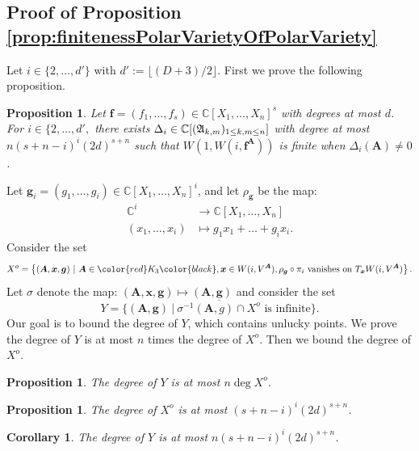 \documentclass[12pt]{article}
\def\mA{{\bm A}}
\def\C{\mathbb{C}}
\newtheorem{corollary}[theorem]{Corollary}
\newtheorem{prop}[theorem]{Proposition}
\def\mA{{\bm A}}
\def\C{\mathbb{C}}
\begin{document}
\subsection{Proof of Proposition \ref{prop:finitenessPolarVarietyOfPolarVariety}}
Let $i\in\{2,\hdots,d' \}$ with $d':=\lfloor (D+3)/2\rfloor.$ First we prove the following proposition.
%
\begin{prop}\label{prop:finitenessPolarVarietyOfPolarVarietyi}
Let $\bm{f} = (f_1,\hdots,f_s)  \in \C[X_1,\hdots,X_n]^s$ with degrees at most $d$. For $i\in\{2,\hdots,d',$ there exists $\Delta_i \in \C[(\frak{A}_{k,m})_{1 \le k,m \le n}]$ with degree at most $n(s+n-i)^i(2d)^{s+n}$ such that $W(1,W(i,\bm{f}^\mA))$ is finite when $\Delta_i(\mA) \neq 0$.
\end{prop}
%
\noindent 
Let $\bm g_i = (g_1,\hdots,g_i) \in \C[X_1,\hdots,X_n]^i$, and let $\rho_{\bm g}$ be the map: 
%
\begin{align*}
\mathbb{C}^i &\rightarrow \C[X_1,\hdots,X_n]\\
(x_1,\hdots,x_i) &\mapsto g_1x_1 + \hdots + g_ix_i.    
\end{align*}
%
Consider the set 
\[
X^o = \left\{ (\bm A,\bm x,\bm g) ~|~ \bm A \in \color{red}K_3\color{black}, \bm x \in W(i,V^\mA), \rho_{\bm g} \circ \pi_i \textrm{ vanishes on } T_{\bm x}W(i,V^\mA) \right\}. 
\]
Let $\sigma$ denote the map: $(\mA,\bm x,\bm g) \mapsto (\mA,\bm g)$ and consider the set 
\[Y = \overline{\{(\mA,\bm g)~|~\sigma^{-1}(\mA,g) \cap X^o \textrm{ is infinite}\}}.\]
Our goal is to bound the degree of $Y$, which contains unlucky points. We prove the degree of $Y$ is at most  $n$ times the degree of $X^o$. Then we bound the degree of $X^o.$
%
\begin{prop}\label{prop:degYatMostnDegXo}
The degree of $Y$ is at most $n\deg X^o$.
\end{prop}
%
\begin{prop}\label{prop:degreeOfXo}
The degree of $X^o$ is at most $(s+n-i)^i(2d)^{s+n}$.
\end{prop}
%
\begin{corollary}\label{cor:degY}
The degree of $Y$ is at most $n(s+n-i)^i(2d)^{s+n}$.
\end{corollary}
%




\end{document}
